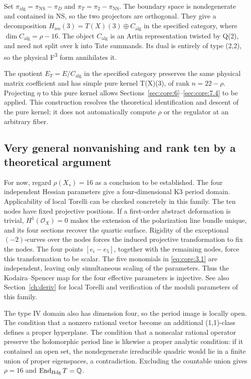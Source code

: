 \documentclass[11pt,a4paper,oneside]{article}
\theoremstyle{plain}
\theoremstyle{definition}
\theoremstyle{remark}
\numberwithin{equation}{section}
\begin{document}
Set \(\pi _{\mathrm{alg}}=\pi _{\mathrm{NS}}- \pi _D\) and \(\pi _T=\pi _{2}- \pi _{\mathrm{NS}}\). The boundary space is nondegenerate and contained in NS, so the two projectors are orthogonal. They give a decomposition \(H_{\mathrm{res}}(3)=T(X)(3)\oplus C_{\mathrm{alg}}\) in the specified category, where \(\dim C_{\mathrm{alg}}=\rho - 16\). The object \(C_{\mathrm{alg}}\) is an Artin representation twisted by Q(2), and need not split over k into Tate summands. Its dual is entirely of type (2,2), so the physical F\textsuperscript{3} form annihilates it.

The quotient \(E_T=E/C_{\mathrm{alg}}\) in the specified category preserves the same physical matrix coefficient and has simple pure kernel T(X)(3), of rank \(n=22- \rho \). Projecting \(\eta \) to this pure kernel allows Sections~\ref{sec:core:6}--\ref{sec:core:7.4} to be applied. This construction resolves the theoretical identification and descent of the pure kernel; it does not automatically compute \(\rho \) or the regulator at an arbitrary fiber.


\subsection{Very general nonvanishing and rank ten by a theoretical argument}\label{sec:core:8}

For now, regard \(\rho(X_s)=16\) as a conclusion to be established. The four independent Hessian parameters give a four-dimensional K3 period domain. Applicability of local Torelli can be checked concretely in this family. The ten nodes have fixed projective positions. If a first-order abstract deformation is trivial, \(H^1(\mathcal O_X)=0\) makes the extension of the polarization line bundle unique, and its four sections recover the quartic surface. Rigidity of the exceptional \((- 2)\)-curves over the nodes forces the induced projective transformation to fix the nodes. The four points \([e_i-e_5]\), together with the remaining nodes, force this transformation to be scalar. The five monomials in \eqref{eq:core:3.1} are independent, leaving only simultaneous scaling of the parameters. Thus the Kodaira--Spencer map for the four effective parameters is injective. See also Section~\ref{ch:deriv} for local Torelli and verification of the moduli parameters of this family.

The type IV domain also has dimension four, so the period image is locally open. The condition that a nonzero rational vector become an additional (1,1)-class defines a proper hyperplane. The condition that a nonscalar rational operator preserve the holomorphic period line is likewise a proper analytic condition: if it contained an open set, the nondegenerate irreducible quadric would lie in a finite union of proper eigenspaces, a contradiction. Excluding the countable union gives \(\rho=16\) and \(\operatorname{End}_{\rm Hdg}T=\mathbb Q\).
\end{document}
